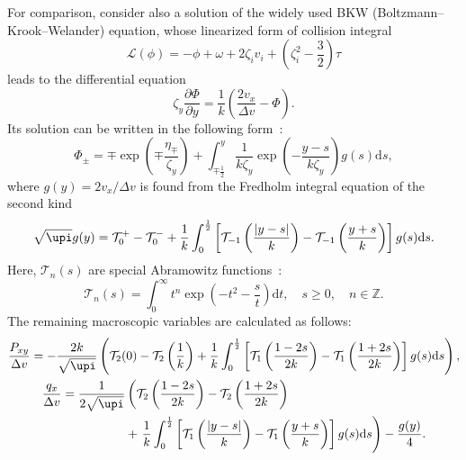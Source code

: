 \documentclass[final]{jfm} %
\newcommand{\dd}{\mathrm{d}}
\newcommand{\pder}[2][]{\frac{\partial#1}{\partial#2}}
\begin{document}
For comparison, consider also a solution of the widely used BKW (Boltzmann--Krook--Welander) equation,
whose linearized form of collision integral
\begin{equation}\label{eq:linear_bkw}
    \mathcal{L}(\phi) = -\phi + \omega + 2\zeta_i v_i + \left(\zeta_i^2-\frac32\right)\tau
\end{equation}
leads to the differential equation
\begin{equation}\label{eq:linear_bkw_equation}
    \zeta_y \pder[\Phi]{y} = \frac1{k}\left( \frac{2v_x}{\Delta{v}} - \Phi \right).
\end{equation}
Its solution can be written in the following form~\citep{Willis1962}:
\begin{equation}\label{eq:bkw_solution}
    \Phi_\pm = \mp \exp\left(\mp\frac{\eta_\mp}{\zeta_y}\right) +
        \int_{\mp\frac12}^y \frac1{k\zeta_y} \exp \left(-\frac{y-s}{k\zeta_y}\right) g(s) \dd{s},
\end{equation}
where \(g(y) = 2v_x/\Delta v\) is found from the Fredholm integral equation of the second kind
\begin{equation}\label{eq:bkw_g_equation}
    \sqrt{\upi} g(y) = \mathcal{T}_0^+ - \mathcal{T}_0^-
        + \frac1k \int_0^{\frac12} \left[ \mathcal{T}_{-1}\left(\frac{|y-s|}{k}\right)
        - \mathcal{T}_{-1}\left(\frac{y+s}{k}\right) \right] g(s) \dd{s}.
\end{equation}
Here, \(\mathcal{T}_n(s)\) are special Abramowitz functions~\citep{Abramowitz1972}:
\begin{equation}\label{eq:Abramowitz}
    \mathcal{T}_n(s) = \int_0^\infty t^n \exp\left(-t^2-\frac{s}{t}\right) \dd t,
    \quad s\ge0, \quad n \in \mathbb{Z}.
\end{equation}
The remaining macroscopic variables are calculated as follows:
\begin{gather}
    \frac{P_{xy}}{\Delta v} = -\frac{2k}{\sqrt{\upi}} \left(
        \mathcal{T}_2(0)-\mathcal{T}_2\left(\frac1k\right)
        + \frac1k\int_0^{\frac12}\left[
            \mathcal{T}_1\left(\frac{1-2s}{2k}\right)-\mathcal{T}_1\left(\frac{1+2s}{2k}\right)
        \right]g(s)\dd{s}
        \right), \label{eq:bkw_macro_Pxy} \\
    \begin{aligned}
    \frac{q_x}{\Delta v} = \frac1{2\sqrt{\upi}}&\left(
        \mathcal{T}_2\left(\frac{1-2s}{2k}\right) - \mathcal{T}_2\left(\frac{1+2s}{2k}\right)\right. \\
        &+\left. \frac1k\int_0^{\frac12}\left[
            \mathcal{T}_1\left(\frac{|y-s|}k\right)-\mathcal{T}_1\left(\frac{y+s}k\right)
        \right]g(s)\dd{s}
        \right) - \frac{g(y)}4.
    \end{aligned} \label{eq:bkw_macro_qx}
\end{gather}
\end{document}
